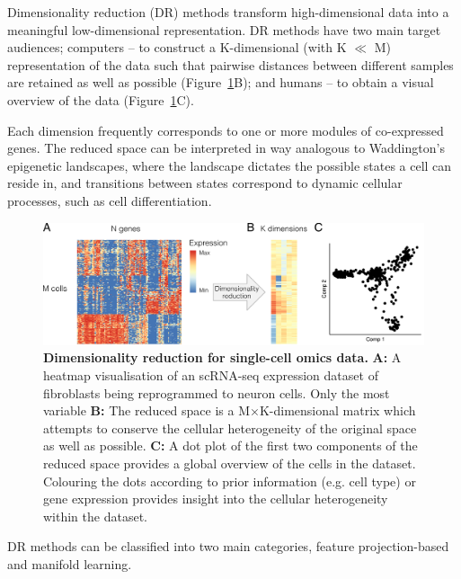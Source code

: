 Dimensionality reduction (DR) methods transform high-dimensional data into a meaningful low-dimensional representation. DR methods have two main target audiences; computers -- to construct a K-dimensional (with K $\ll$ M) representation of the data such that pairwise distances between different samples are retained as well as possible (Figure~\ref{fig:comp_tools_dimred}B); and humans -- to obtain a visual overview of the data (Figure~\ref{fig:comp_tools_dimred}C).

Each dimension frequently corresponds to one or more modules of co-expressed genes.  The reduced space can be interpreted in way analogous to Waddington’s epigenetic landscapes\cite{waddington_strategygenesdiscussion_1957,ferrell_bistabilitybifurcationswaddington_2012,rebhahn_animatedlandscaperepresentation_2014}, where the landscape dictates the possible states a cell can reside in, and transitions between states correspond to dynamic cellular processes, such as cell differentiation. 

\begin{figure}[htb!]
	\centering
	\includegraphics[width=\linewidth]{fig/comptools2/comptool_1_dimred.pdf} 
	\caption{
		\textbf{Dimensionality reduction for single-cell omics data.}
		\textbf{A:} A heatmap visualisation of an scRNA-seq expression dataset of fibroblasts being reprogrammed to neuron cells\cite{treutlein_dissectingdirectreprogramming_2016}. Only the most variable 
		\textbf{B:} The reduced space is a M$\times$K-dimensional matrix which attempts to conserve the cellular heterogeneity of the original space as well as possible.
		\textbf{C:} A dot plot of the first two components of the reduced space provides a global overview of the cells in the dataset. Colouring the dots according to prior information (e.g. cell type) or gene expression provides insight into the cellular heterogeneity within the dataset.
	}
	\label{fig:comp_tools_dimred}
\end{figure}

DR methods can be classified into two main categories, feature projection-based and manifold learning\cite{engel_surveydimensionreduction_2012}. 

